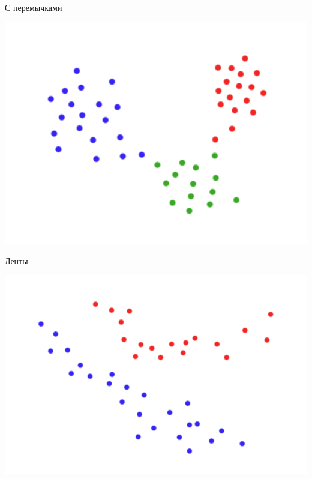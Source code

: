 \documentclass[10pt]{beamer}
\begin{document}
\begin{frame}{С перемычками}
	\begin{center}
	  \includegraphics[height=0.6 \textheight, keepaspectratio = true]{images/cluster4}  
	\end{center}
\end{frame}

\begin{frame}{Ленты}
	\begin{center}
	  \includegraphics[height=0.6 \textheight, keepaspectratio = true]{images/cluster2}  
	\end{center}
\end{frame}
\end{document}
